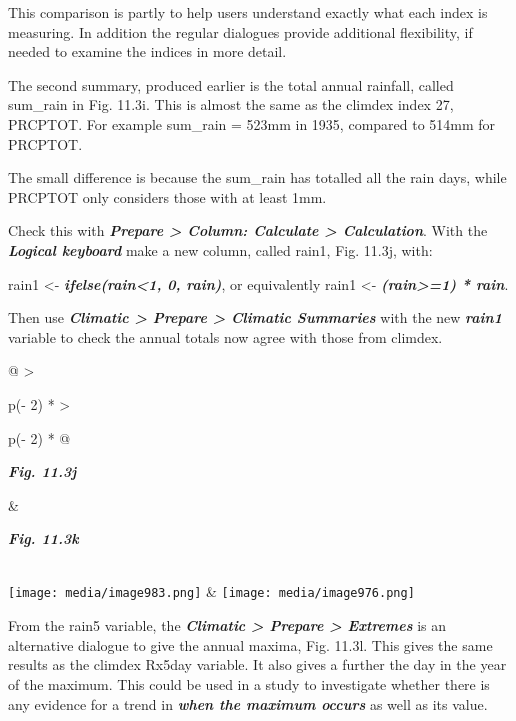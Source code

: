 \documentclass[
  letterpaper,
  DIV=11,
  numbers=noendperiod]{scrreprt}
\begin{document}
This comparison is partly to help users understand exactly what each
index is measuring. In addition the regular dialogues provide additional
flexibility, if needed to examine the indices in more detail.

The second summary, produced earlier is the total annual rainfall,
called sum\_rain in Fig. 11.3i. This is almost the same as the climdex
index 27, PRCPTOT. For example sum\_rain = 523mm in 1935, compared to
514mm for PRCPTOT.

The small difference is because the sum\_rain has totalled all the rain
days, while PRCPTOT only considers those with at least 1mm.

Check this with \textbf{\emph{Prepare \textgreater{} Column: Calculate
\textgreater{} Calculation}}. With the \textbf{\emph{Logical keyboard}}
make a new column, called rain1, Fig. 11.3j, with:

rain1 \textless- \textbf{\emph{ifelse(rain\textless1, 0, rain)}}, or
equivalently rain1 \textless- \textbf{\emph{(rain\textgreater=1) *
rain}}.

Then use \textbf{\emph{Climatic \textgreater{} Prepare \textgreater{}
Climatic Summaries}} with the new \textbf{\emph{rain1}} variable to
check the annual totals now agree with those from climdex.

\begin{longtable}[]{@{}
  >{\raggedright\arraybackslash}p{(\columnwidth - 2\tabcolsep) * }
  >{\raggedright\arraybackslash}p{(\columnwidth - 2\tabcolsep) * }@{}}
\toprule\noalign{}
\begin{minipage}[b]{\linewidth}\raggedright
\textbf{\emph{Fig. 11.3j}}
\end{minipage} & \begin{minipage}[b]{\linewidth}\raggedright
\textbf{\emph{Fig. 11.3k}}
\end{minipage} \\
\midrule\noalign{}
\endhead
\bottomrule\noalign{}
\endlastfoot
\texttt{[image: media/image983.png]} &
\texttt{[image: media/image976.png]} \\
\end{longtable}

From the rain5 variable, the \textbf{\emph{Climatic \textgreater{}
Prepare \textgreater{} Extremes}} is an alternative dialogue to give the
annual maxima, Fig. 11.3l. This gives the same results as the climdex
Rx5day variable. It also gives a further the day in the year of the
maximum. This could be used in a study to investigate whether there is
any evidence for a trend in \textbf{\emph{when the maximum occurs}} as
well as its value.
\end{document}
